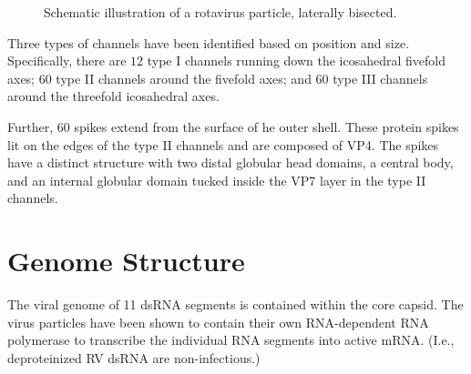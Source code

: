 \begin{figure}[htp]
\begin{center}
\end{center}
\caption{Schematic illustration of a rotavirus particle, laterally bisected.}
\label{fig01}
\end{figure}

Three types of channels have been identified based on position and size. Specifically, there are $12$ type I channels running down the icosahedral fivefold axes; 60 type II channels around the fivefold axes; and 60 type III channels around the threefold icosahedral axes.

Further, 60 spikes extend from the surface of he outer shell. These protein spikes lit on the edges of the type II channels and are composed of VP4. The spikes have a distinct structure with two distal globular head domains, a central body, and an internal globular domain tucked inside the VP7 layer in the type II channels.  

\section{Genome Structure}

The viral genome of 11 dsRNA segments is contained within the core capsid. The virus particles have been shown to contain their own RNA-dependent RNA polymerase to transcribe the individual RNA segments into active mRNA. (I.e., deproteinized RV dsRNA are non-infectious.)

